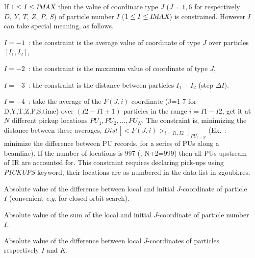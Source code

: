 \hspace{-10ex}
\label{TabFITZlst1}
    {\renewcommand{\arraystretch}{1}







\smallskip

 If $1\leq I\leq \textsl{IMAX}$ then the value of coordinate type $J$ ($J=1,6$ for respectively 
 $D,~Y,~T,~Z,~P,~S$) of particle number $I$ ($1\leq I\leq \textsl{IMAX}$) is constrained.  However $I$ can take 
special meaning, as follows. 

$I=-1$~:  the constraint is the average value of coordinate of type $J$ over particles $[I_1,I_2]$, 

$I=-2$~:  the constraint is the maximum  value of coordinate of type $J$, 

$I=-3$~:  the constraint is the distance  between  particles $ I_1-I_2$ (step $\Delta I$).  

$I=-4$~: take the  average of the $F(J,i)$ coordinate (J=1-7 for D,Y,T,Z,P,S,time) over  $(I2-I1+1)$ particles in the range $i = I1-I2$, get it at $N$ different  pickup locations $PU_1, PU_2, ..., PU_N$. The constraint is, minimizing the distance between these averages, 
$Dist\left[ <\! F(J,i)\! >_{i=I1,I2}\right]_{PU_{1-N}}$ (Ex.~: minimize the difference between PU records, for a series of PUs along a beamline). 
If the number of locations is $997$ (\ie, N+2=999) then all PUs upstream of IR are accounted for.
This constraint requires declaring pick-ups using  \textsl{PICKUPS} keyword, their locations are as numbered in the data list 
in zgoubi.res. 

\smallskip

 Absolute value of the difference between local and initial $J$-coordinate of particle $I$ (convenient 
\emph{e.g.} for closed orbit search). 

\smallskip

 Absolute value of the sum of the local and initial $J$-coordinate of particle number $I$.


\smallskip

 Absolute value of the difference between local $J$-coordinates of particles respectively 
 $I$ and $K$.

}
